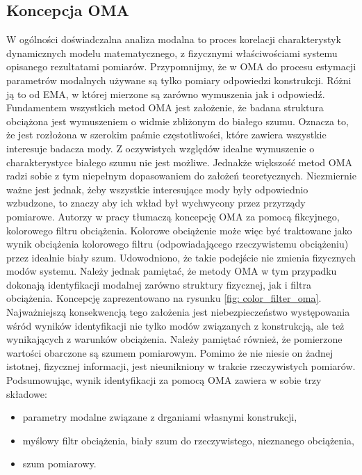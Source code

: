 \subsection{Koncepcja OMA}
W ogólności doświadczalna analiza modalna to proces korelacji charakterystyk dynamicznych modelu matematycznego, z fizycznymi właściwościami systemu opisanego rezultatami pomiarów. Przypomnijmy, że w OMA do procesu estymacji parametrów modalnych używane są tylko pomiary odpowiedzi konstrukcji. Różni ją to od EMA, w której mierzone są zarówno wymuszenia jak i odpowiedź. 
Fundamentem wszystkich metod OMA jest założenie, że badana struktura obciążona jest wymuszeniem o widmie zbliżonym do białego szumu. Oznacza to, że  jest rozłożona w szerokim paśmie częstotliwości, które zawiera wszystkie interesuje badacza mody. Z oczywistych względów idealne wymuszenie o charakterystyce białego szumu nie jest możliwe. Jednakże większość metod OMA radzi sobie z tym niepełnym dopasowaniem do założeń teoretycznych. Niezmiernie ważne jest jednak, żeby wszystkie interesujące mody były odpowiednio wzbudzone, to znaczy aby ich wkład był wychwycony przez przyrządy pomiarowe. Autorzy w pracy \cite{Brincker2015} tłumaczą koncepcję OMA za  pomocą fikcyjnego, kolorowego filtru obciążenia.  Kolorowe obciążenie może więc być traktowane jako wynik obciążenia kolorowego filtru (odpowiadającego rzeczywistemu obciążeniu) przez idealnie biały szum. Udowodniono, że takie podejście nie zmienia fizycznych modów systemu. Należy jednak pamiętać, że metody OMA w tym przypadku dokonają identyfikacji modalnej zarówno struktury fizycznej, jak i filtra obciążenia. Koncepcję zaprezentowano na rysunku \ref{fig: color_filter_oma}. Najważniejszą konsekwencją tego założenia jest niebezpieczeństwo występowania wśród wyników identyfikacji nie tylko modów związanych z konstrukcją, ale też wynikających z warunków obciążenia. Należy pamiętać również, że pomierzone wartości obarczone są szumem pomiarowym. Pomimo że nie niesie on żadnej istotnej, fizycznej informacji, jest nieunikniony w trakcie rzeczywistych pomiarów. Podsumowując, wynik identyfikacji za pomocą OMA zawiera w sobie trzy składowe:
\begin{itemize}
	\item parametry modalne związane z drganiami własnymi konstrukcji,
	\item myślowy filtr obciążenia,  biały szum do rzeczywistego, nieznanego obciążenia,
	\item szum pomiarowy.
\end{itemize} 
